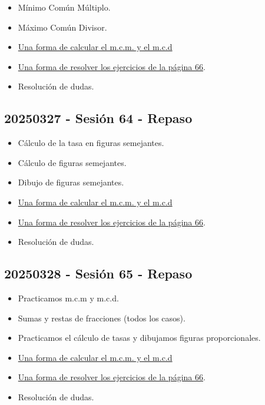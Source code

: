 \documentclass[a4paper,12pt]{article}
\begin{document}
\begin{itemize}
    \item Mínimo Común Múltiplo.
    \item Máximo Común Divisor.
    \item \href{https://xto.sarcior.com/documents/maths/mcm_mcd.pdf}{Una forma de calcular el m.c.m. y el m.c.d}
    \item \href{https://xto.sarcior.com/documents/maths/ejercicios_66.pdf}{Una forma de resolver los ejercicios de la página 66}.
    \item Resolución de dudas.
\end{itemize}

\subsection{20250327 - Sesión 64 - Repaso}

\begin{itemize}
    \item Cálculo de la tasa en figuras semejantes.
    \item Cálculo de figuras semejantes.
    \item Dibujo de figuras semejantes.
    \item \href{https://xto.sarcior.com/documents/maths/mcm_mcd.pdf}{Una forma de calcular el m.c.m. y el m.c.d}
    \item \href{https://xto.sarcior.com/documents/maths/ejercicios_66.pdf}{Una forma de resolver los ejercicios de la página 66}.
    \item Resolución de dudas.
\end{itemize}

\subsection{20250328 - Sesión 65 - Repaso}

\begin{itemize}
    \item Practicamos m.c.m y m.c.d.
    \item Sumas y restas de fracciones (todos los casos).
    \item Practicamos el cálculo de tasas y dibujamos figuras proporcionales.
    \item \href{https://xto.sarcior.com/documents/maths/mcm_mcd.pdf}{Una forma de calcular el m.c.m. y el m.c.d}
    \item \href{https://xto.sarcior.com/documents/maths/ejercicios_66.pdf}{Una forma de resolver los ejercicios de la página 66}.
    \item Resolución de dudas.
\end{itemize}
\end{document}
